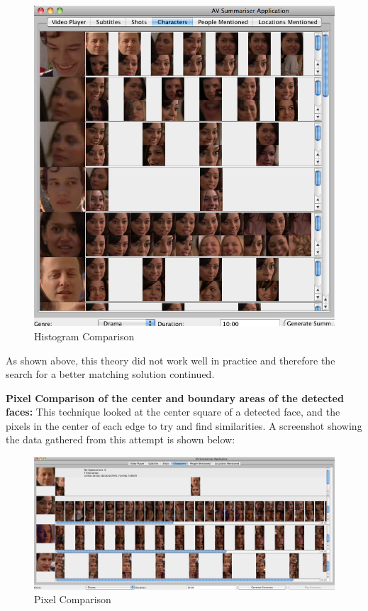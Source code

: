 \begin{figure}[ht]
\begin{center}
 \includegraphics[trim = 0mm 0mm 0mm 0mm, clip,
 scale=0.4]{Images/Histogram.png}
  \caption{Histogram Comparison}
 \end{center}
\end{figure}

As shown above, this theory did not work well in practice and therefore the search for a better matching solution continued.

\newpage
\textbf{Pixel Comparison of the center and boundary areas of the detected faces:} This technique looked at the center square of a detected face, and the pixels in the center of each edge to try and find similarities. A screenshot showing the data gathered from this attempt is shown below:

\begin{figure}[ht]
\begin{center}
 \includegraphics[trim = 0mm 0mm 0mm 0mm, clip,
 scale=0.26]{Images/PixelComparison.png}
  \caption{Pixel Comparison}
 \end{center}
\end{figure}

